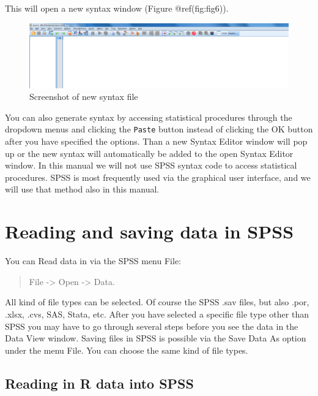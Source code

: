 \documentclass[
]{book}
\begin{document}
This will open a new syntax window (Figure @ref(fig:fig6)).

\begin{figure}

{\centering \includegraphics[width=0.95\linewidth]{images/fig1.6} 

}

\caption{Screenshot of new syntax file}\label{fig:fig6}
\end{figure}

You can also generate syntax by accessing statistical procedures through
the dropdown menus and clicking the \texttt{Paste} button instead of
clicking the OK button after you have specified the options. Than a new
Syntax Editor window will pop up or the new syntax will automatically be
added to the open Syntax Editor window. In this manual we will not use
SPSS syntax code to access statistical procedures. SPSS is most
frequently used via the graphical user interface, and we will use that
method also in this manual.

\hypertarget{reading-and-saving-data-in-spss}{%
\section{Reading and saving data in
SPSS}\label{reading-and-saving-data-in-spss}}

You can Read data in via the SPSS menu File:

\begin{quote}
File -\textgreater{} Open -\textgreater{} Data.
\end{quote}

All kind of file types can be selected. Of course the SPSS .sav files,
but also .por, .xlsx, .cvs, SAS, Stata, etc. After you have selected a
specific file type other than SPSS you may have to go through several
steps before you see the data in the Data View window. Saving files in
SPSS is possible via the Save Data As option under the menu File. You
can choose the same kind of file types.

\hypertarget{reading-in-r-data-into-spss}{%
\subsection{Reading in R data into
SPSS}\label{reading-in-r-data-into-spss}}
\end{document}

